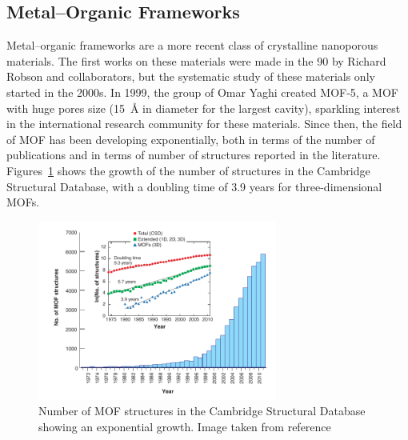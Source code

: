 \documentclass[thesis]{subfiles}
\begin{document}
\newpage
\subsection{Metal--Organic Frameworks}

Metal--organic frameworks are a more recent class of crystalline nanoporous
materials. The first works on these materials were made in the 90 by Richard
Robson and collaborators\cite{Abrahams1991, Robson2008}, but the systematic
study of these materials only started in the 2000s. In 1999, the group of Omar
Yaghi created MOF-5\cite{Li1999}, a MOF with huge pores size (\SI{15}{\AA} in
diameter for the largest cavity), sparkling interest in the international
research community for these materials. Since then, the field of MOF has been
developing exponentially, both in terms of the number of publications and in
terms of number of structures reported in the literature.
Figures~\ref{fig:number-of-mofs} shows the growth of the number of structures in
the Cambridge Structural Database, with a doubling time of 3.9 years for
three-dimensional MOFs.

\begin{figure}[ht]
    \centering
    \includegraphics[width=0.7\textwidth]{figures/cited/number-of-mofs}
    \caption{Number of MOF structures in the Cambridge Structural Database
    showing an exponential growth. Image taken from reference~\cite{Furukawa2013}}
    \label{fig:number-of-mofs}
\end{figure}
\end{document}
